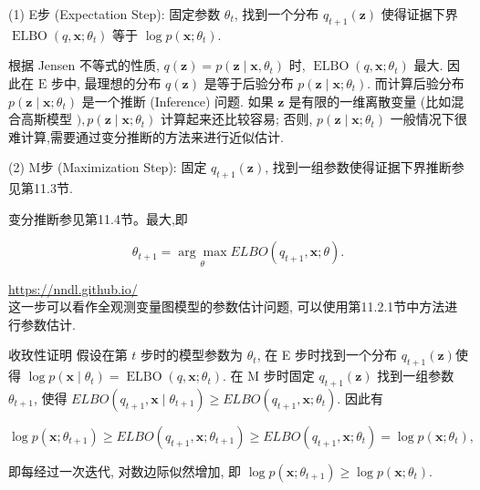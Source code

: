 \documentclass[10pt]{article}
\begin{document}
(1) E步 (Expectation Step): 固定参数 $\theta_{t}$, 找到一个分布 $q_{t+1}(\boldsymbol{z})$ 使得证据下界 $\operatorname{ELBO}\left(q, \boldsymbol{x} ; \theta_{t}\right)$ 等于 $\log p\left(\boldsymbol{x} ; \theta_{t}\right)$.

根据 Jensen 不等式的性质, $q(\boldsymbol{z})=p\left(\boldsymbol{z} \mid \boldsymbol{x}, \theta_{t}\right)$ 时, $\operatorname{ELBO}\left(q, \boldsymbol{x} ; \theta_{t}\right)$ 最大. 因此在 $\mathrm{E}$ 步中, 最理想的分布 $q(\boldsymbol{z})$ 是等于后验分布 $p\left(\boldsymbol{z} \mid \boldsymbol{x} ; \theta_{t}\right)$. 而计算后验分布 $p\left(\boldsymbol{z} \mid \boldsymbol{x} ; \theta_{t}\right)$ 是一个推断 (Inference) 问题. 如果 $\boldsymbol{z}$ 是有限的一维离散变量 (比如混合高斯模型 $), p\left(\boldsymbol{z} \mid \boldsymbol{x} ; \theta_{t}\right)$ 计算起来还比较容易; 否则, $p\left(\boldsymbol{z} \mid \boldsymbol{x} ; \theta_{t}\right)$ 一般情况下很难计算,需要通过变分推断的方法来进行近似估计.

(2) M步 (Maximization Step): 固定 $q_{t+1}(\boldsymbol{z})$, 找到一组参数使得证据下界推断参见第11.3节.

变分推断参见第11.4节。最大,即


\begin{equation*}
\theta_{t+1}=\underset{\theta}{\arg \max } E L B O\left(q_{t+1}, \boldsymbol{x} ; \theta\right) . \tag{11.44}
\end{equation*}


\href{https://nndl.github.io/}{https://nndl.github.io/}\\
这一步可以看作全观测变量图模型的参数估计问题, 可以使用第11.2.1节中方法进行参数估计.

收玫性证明 假设在第 $t$ 步时的模型参数为 $\theta_{t}$, 在 E 步时找到一个分布 $q_{t+1}(\boldsymbol{z})$使得 $\log p\left(\boldsymbol{x} \mid \theta_{t}\right)=\operatorname{ELBO}\left(q, \boldsymbol{x} ; \theta_{t}\right)$. 在 $\mathrm{M}$ 步时固定 $q_{t+1}(\boldsymbol{z})$ 找到一组参数 $\theta_{t+1}$, 使得 $E L B O\left(q_{t+1}, \boldsymbol{x} \mid \theta_{t+1}\right) \geq E L B O\left(q_{t+1}, \boldsymbol{x} ; \theta_{t}\right)$. 因此有


\begin{equation*}
\log p\left(\boldsymbol{x} ; \theta_{t+1}\right) \geq E L B O\left(q_{t+1}, \boldsymbol{x} ; \theta_{t+1}\right) \geq E L B O\left(q_{t+1}, \boldsymbol{x} ; \theta_{t}\right)=\log p\left(\boldsymbol{x} ; \theta_{t}\right), \tag{11.45}
\end{equation*}


即每经过一次迭代, 对数边际似然增加, 即 $\log p\left(\boldsymbol{x} ; \theta_{t+1}\right) \geq \log p\left(\boldsymbol{x} ; \theta_{t}\right)$.
\end{document}
